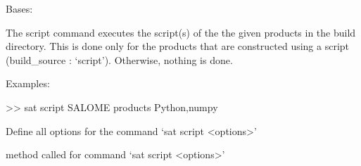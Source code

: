 \documentclass[a4paper,10pt,english]{sphinxmanual}
\begin{document}
\begin{fulllineitems}
\label{\detokenize{apidoc_commands/commands:commands.script.Command}}
Bases: 

The script command executes the script(s) of the the given products in the build directory.
This is done only for the products that are constructed using a script (build\_source : ‘script’).
Otherwise, nothing is done.

\begin{DUlineblock}{0em}
\item[] Examples:
\item[]
\begin{DUlineblock}{\DUlineblockindent}
\item[] \textgreater{}\textgreater{} sat script SALOME \textendash{}products Python,numpy
\end{DUlineblock}
\end{DUlineblock}

\begin{fulllineitems}
\label{\detokenize{apidoc_commands/commands:commands.script.Command.getParser}}
Define all options for the command ‘sat script \textless{}options\textgreater{}’

\end{fulllineitems}


\begin{fulllineitems}
\label{\detokenize{apidoc_commands/commands:commands.script.Command.name}}
\end{fulllineitems}


\begin{fulllineitems}
\label{\detokenize{apidoc_commands/commands:commands.script.Command.run}}
method called for command ‘sat script \textless{}options\textgreater{}’

\end{fulllineitems}


\end{fulllineitems}
\end{document}
